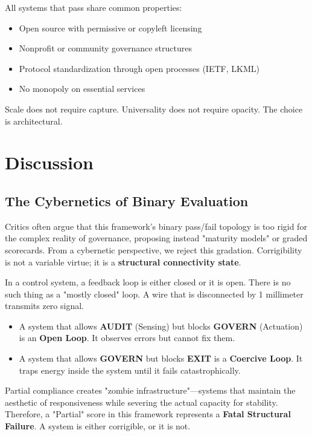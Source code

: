 \documentclass{article}
\begin{document}
All systems that pass share common properties:
\begin{itemize}
    \item Open source with permissive or copyleft licensing
    \item Nonprofit or community governance structures
    \item Protocol standardization through open processes (IETF, LKML)
    \item No monopoly on essential services
\end{itemize}

Scale does not require capture. Universality does not require opacity. The choice is architectural.

\section{Discussion}
\label{sec:discussion}

\subsection{The Cybernetics of Binary Evaluation}

Critics often argue that this framework's binary pass/fail topology is too rigid for the complex reality of governance, proposing instead "maturity models" or graded scorecards. From a cybernetic perspective, we reject this gradation. Corrigibility is not a variable virtue; it is a \textbf{structural connectivity state}.

In a control system, a feedback loop is either closed or it is open. There is no such thing as a "mostly closed" loop. A wire that is disconnected by 1 millimeter transmits zero signal.

\begin{itemize}
    \item A system that allows \textbf{AUDIT} (Sensing) but blocks \textbf{GOVERN} (Actuation) is an \textbf{Open Loop}. It observes errors but cannot fix them.
    \item A system that allows \textbf{GOVERN} but blocks \textbf{EXIT} is a \textbf{Coercive Loop}. It traps energy inside the system until it fails catastrophically.
\end{itemize}

Partial compliance creates "zombie infrastructure"---systems that maintain the aesthetic of responsiveness while severing the actual capacity for stability. Therefore, a "Partial" score in this framework represents a \textbf{Fatal Structural Failure}. A system is either corrigible, or it is not.
\end{document}
